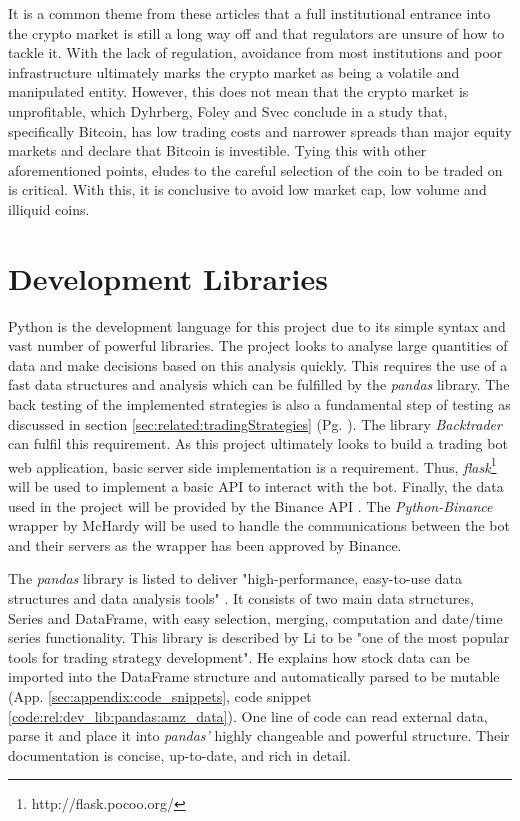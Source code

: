 It is a common theme from these articles that a full institutional entrance into the crypto market is still a long way off and that regulators are unsure of how to tackle it. With the lack of regulation, avoidance from most institutions and poor infrastructure ultimately marks the crypto market as being a volatile and manipulated entity. However, this does not mean that the crypto market is unprofitable, which Dyhrberg, Foley and Svec \cite{ART:Dyhrberg:2018} conclude in a study that, specifically Bitcoin, has low trading costs and narrower spreads than major equity markets and declare that Bitcoin is investible. Tying this with other aforementioned points, eludes to the careful selection of the coin to be traded on is critical. With this, it is conclusive to avoid low market cap, low volume and illiquid coins. 

\section{Development Libraries}
\label{sec:related:developmentLibraries}

Python is the development language for this project due to its simple syntax and vast number of powerful libraries. The project looks to analyse large quantities of data and make decisions based on this analysis quickly. This requires the use of a fast data structures and analysis which can be fulfilled by the \textit{pandas} \cite{WEB:PANDAS} library. The back testing of the implemented strategies is also a fundamental step of testing as discussed in section \ref{sec:related:tradingStrategies} (Pg. \pageref{sec:related:tradingStrategies}). The library \textit{Backtrader} \cite{MISC:BACKTRADER} can fulfil this requirement. As this project ultimately looks to build a trading bot web application, basic server side implementation is a requirement. Thus, \textit{flask}\footnote{http://flask.pocoo.org/}  will be used to implement a basic API to interact with the bot. Finally, the data used in the project will be provided by the Binance API \cite{WEB:BINANCE_API:2018}. The \textit{Python-Binance} wrapper by McHardy \cite{MISC:Python-Binance} will be used to handle the communications between the bot and their servers as the wrapper has been approved by Binance.

The \textit{pandas} library is listed to deliver "high-performance, easy-to-use data structures and data analysis tools" \cite{WEB:PANDAS}. It consists of two main data structures, Series and DataFrame, with easy selection, merging, computation and date/time series functionality. This library is described by Li \cite{ART:LI:2018} to be "one of the most popular tools for trading strategy development". He explains how stock data can be imported into the DataFrame structure and automatically parsed to be mutable (App. \ref{sec:appendix:code_snippets}, code snippet \ref{code:rel:dev_lib:pandas:amz_data}). One line of code can read external data, parse it and place it into \textit{pandas'} highly changeable and powerful structure. Their documentation is concise, up-to-date, and rich in detail.

